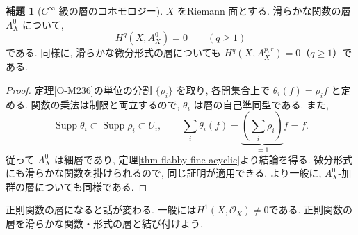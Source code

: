 \documentclass[dvipdfmx,a4paper,11pt]{article} %
\theoremstyle{definition}
\numberwithin{equation}{section}
\newtheorem{lem}[thm]{補題}
\begin{document}
\begin{lem}[$C^\infty$ 級の層のコホモロジー]\label{O-M238}
$X$ をRiemann 面とする. 滑らかな関数の層 $A_X^0$ について,
\[
H^q(X,A_X^0)=0\qquad(q\geq1)
\]
である. 同様に, 滑らかな微分形式の層についても
$H^q(X,A_X^{p,r})=0$（$q\geq1$）である.
\end{lem}
\begin{proof}
定理\ref{O-M236}の単位の分割 $\{\rho_i\}$ を取り,
各開集合上で $\theta_i(f)=\rho_i f$ と定める.
関数の乗法は制限と両立するので, $\theta_i$ は層の自己準同型である.
また,
\[
\operatorname{Supp}\theta_i\subset\operatorname{Supp}\rho_i\subset U_i,
\qquad
\sum_i\theta_i(f)=\underbrace{\left(\sum_i\rho_i\right)}_{=1}f=f.
\]
従って $A_X^0$ は細層であり, 定理\ref{thm-flabby-fine-acyclic}より結論を得る.
微分形式にも滑らかな関数を掛けられるので, 同じ証明が適用できる.
より一般に, $A_X^0$-加群の層についても同様である.
\end{proof}

正則関数の層になると話が変わる. 
一般には$H^1(X,\mathcal O_X) \neq 0$である. 
正則関数の層を滑らかな関数・形式の層と結び付けよう. 
\end{document}
